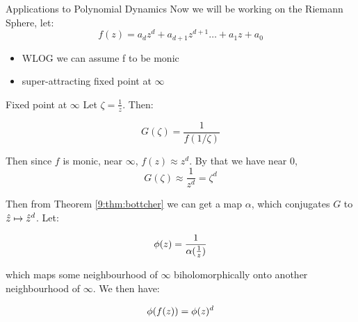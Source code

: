 \begin{frame}{Applications to Polynomial Dynamics}
    Now we will be working on the Riemann Sphere, let:
    \begin{equation}
f(z) = a_dz^d + a_{d+1}z^{d+1}\dots+a_1z + a_0
\end{equation}

\begin{itemize}
    \item WLOG we can assume f to be monic
    \item super-attracting fixed point at $\infty$
\end{itemize}
\end{frame}





    

\begin{frame}{Fixed point at $\infty$}
Let $\zeta = \frac{1}{z}$. Then:

$$G(\zeta) = \frac{1}{f(1/\zeta)}$$

Then since $f$ is monic, near $\infty$, $f(z) \approx z^d$. By that we have near 0, $$G(\zeta) \approx \frac{1}{z^d} = \zeta^d$$

Then from Theorem \ref{9:thm:bottcher} we can get a map $\alpha$, which conjugates $G$ to $\hat{z} \mapsto \hat{z}^d$. Let:

$$\phi(z) = \frac{1}{\alpha(\frac{1}{z})}$$

which maps some neighbourhood of $\infty$ biholomorphically onto another neighbourhood of $\infty$. We then have:

$$\phi(f(z)) = \phi(z)^d$$

\end{frame}

